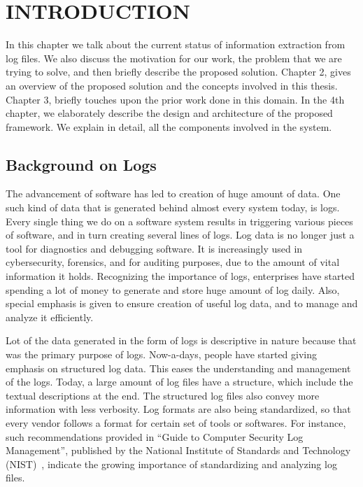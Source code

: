 \chapter{INTRODUCTION}
\thispagestyle{plain}

\label{Introduction}

In this chapter we talk about the current status of information extraction from log files. We also discuss the motivation for our work, the problem that we are trying to solve, and then briefly describe the proposed solution. Chapter 2, gives an overview of the proposed solution and the concepts involved in this thesis. Chapter 3, briefly touches upon the prior work done in this domain. In the 4th chapter, we elaborately describe the design and architecture of the proposed framework. We explain in detail, all the components involved in the system.


\section{Background on Logs}

The advancement of software has led to creation of huge amount of data. One such kind of data that is generated behind almost every system today, is logs. Every single thing we do on a software system results in triggering various pieces of software, and in turn creating several lines of logs. Log data is no longer just a tool for diagnostics and debugging software. It is increasingly used in cybersecurity, forensics, and for auditing purposes, due to the amount of vital information it holds. Recognizing the importance of logs, enterprises have started spending a lot of money to generate and store huge amount of log daily. Also, special emphasis is given to ensure creation of useful log data,  and to manage and analyze it efficiently.

Lot of the data generated in the form of logs is descriptive in nature because that was the primary purpose of logs. Now-a-days, people have started giving emphasis on structured log data. This eases the understanding and management of the logs. Today, a large amount of log files have a structure, which include the textual descriptions at the end. The structured log files also convey more information with less verbosity. Log formats are also being standardized, so that every vendor follows a format for certain set of tools or softwares. For instance, such recommendations provided in ``Guide to Computer Security Log Management'', published by the National Institute of Standards and Technology (NIST)~\cite{nist_guide}, indicate the growing importance of standardizing and analyzing log files.


